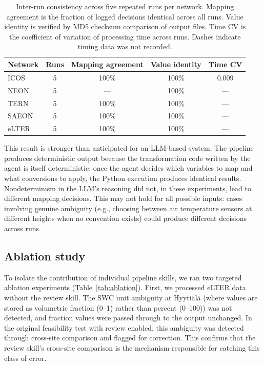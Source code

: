 \documentclass[review,authoryear]{elsarticle}
\begin{document}
\begin{table}[htbp]
\centering
\caption{Inter-run consistency across five repeated runs per network. Mapping agreement is the fraction of logged decisions identical across all runs. Value identity is verified by MD5 checksum comparison of output files. Time CV is the coefficient of variation of processing time across runs. Dashes indicate timing data was not recorded.}
\label{tab:consistency}
\small
\begin{tabular}{lcccc}
\toprule
Network & Runs & Mapping agreement & Value identity & Time CV \\
\midrule
ICOS & 5 & 100\% & 100\% & 0.009 \\
NEON & 5 & --- & 100\% & --- \\
TERN & 5 & 100\% & 100\% & --- \\
SAEON & 5 & 100\% & 100\% & --- \\
eLTER & 5 & 100\% & 100\% & --- \\
\bottomrule
\end{tabular}
\end{table}

This result is stronger than anticipated for an LLM-based system. The pipeline produces deterministic output because the transformation code written by the agent is itself deterministic: once the agent decides which variables to map and what conversions to apply, the Python execution produces identical results. Nondeterminism in the LLM's reasoning did not, in these experiments, lead to different mapping decisions. This may not hold for all possible inputs: cases involving genuine ambiguity (e.g., choosing between air temperature sensors at different heights when no convention exists) could produce different decisions across runs.

\subsection{Ablation study}
\label{sec:ablation}


To isolate the contribution of individual pipeline skills, we ran two targeted ablation experiments (Table~\ref{tab:ablation}). First, we processed eLTER data without the review skill. The SWC unit ambiguity at Hyyti\"{a}l\"{a} (where values are stored as volumetric fraction (0--1) rather than percent (0--100)) was not detected, and fraction values were passed through to the output unchanged. In the original feasibility test with review enabled, this ambiguity was detected through cross-site comparison and flagged for correction. This confirms that the review skill's cross-site comparison is the mechanism responsible for catching this class of error.
\end{document}
